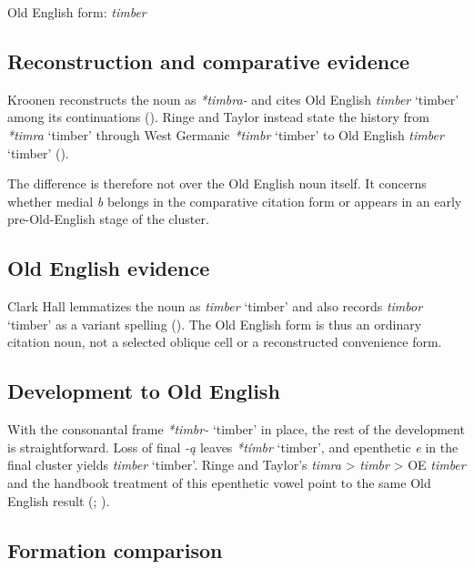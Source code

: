 \documentclass[
  british,
  a4paper,
  openany]{book}
\providecommand{\Recon}[1]{\emph{*#1}}
{\catcode`→=\active \global\def→{\ensuremath{\rightarrow}}}
\providecommand{\Recon}[1]{\emph{*#1}}
{\catcode`→=\active \global\def→{\ensuremath{\rightarrow}}}
\begin{document}
Old English form: \emph{timber}

\subsection{Reconstruction and comparative
evidence}\label{reconstruction-and-comparative-evidence-100}

Kroonen reconstructs the noun as {\emph{*timbra-}} and cites Old English
{\emph{timber}} `timber' among its continuations
(). Ringe and Taylor
instead state the history from \Recon{timra} `timber' through West
Germanic {\Recon{timbr} `timber'} to Old English {\emph{timber}}
`timber' ().

The difference is therefore not over the Old English noun itself. It
concerns whether medial \emph{b} belongs in the comparative citation
form or appears in an early pre-Old-English stage of the cluster.

\subsection{Old English evidence}\label{old-english-evidence-100}

Clark Hall lemmatizes the noun as {\emph{timber}} `timber' and also
records {\emph{timbor}} `timber' as a variant spelling
(). The Old English
form is thus an ordinary citation noun, not a selected oblique cell or a
reconstructed convenience form.

\subsection{Development to Old
English}\label{development-to-old-english-100}

With the consonantal frame \Recon{timbr-} `timber' in place, the rest of
the development is straightforward. Loss of final \emph{-ą} leaves
\Recon{tímbr} `timber', and epenthetic \emph{e} in the final cluster
yields {\emph{timber}} `timber'. Ringe and Taylor's \emph{timra}
\textgreater{} \emph{timbr} \textgreater{} OE \emph{timber} and the
handbook treatment of this epenthetic vowel point to the same Old
English result (; ).

\subsection{Formation comparison}\label{formation-comparison-6}
\end{document}
